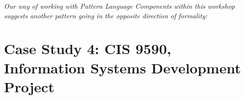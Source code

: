 \documentclass[acmlarge,timestamp]{acmart}
\begin{document}
\smallskip
\noindent\emph{Our way of working with {\sc Pattern Language
  Components} within this workshop suggests another pattern going in
the opposite direction of formality:}






\section{Case Study 4: CIS 9590, Information Systems Development Project} \label{cis-case-study}
\end{document}
